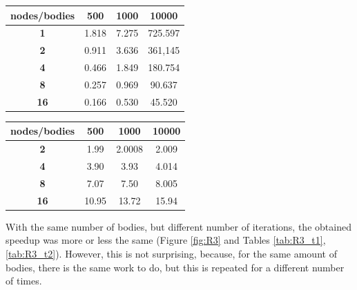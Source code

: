 \documentclass[a4paper]{article}
\begin{document}
\begin{minipage}[b]{.40\textwidth}
  \centering
\begin{tabular}{c|c|c|c}
\textbf{nodes/bodies} & \textbf{500} & \textbf{1000} & \textbf{10000} \\ \hline
\textbf{1}            & 1.818        & 7.275         & 725.597        \\ \hline
\textbf{2}            & 0.911        & 3.636         & 361,145        \\ \hline
\textbf{4}            & 0.466        & 1.849         & 180.754        \\ \hline
\textbf{8}            & 0.257        & 0.969         & 90.637         \\ \hline
\textbf{16}           & 0.166        & 0.530         & 45.520        
\end{tabular}
  \label{tab:R2_t1}
\end{minipage} \qquad
\begin{minipage}[b]{.40\textwidth}
  \centering
\begin{tabular}{c|c|c|c}
\textbf{nodes/bodies} & \textbf{500} & \textbf{1000} & \textbf{10000} \\ \hline
\textbf{2}            & 1.99         & 2.0008        & 2.009          \\ \hline
\textbf{4}            & 3.90         & 3.93          & 4.014          \\ \hline
\textbf{8}            & 7.07         & 7.50          & 8.005          \\ \hline
\textbf{16}           & 10.95        & 13.72         & 15.94         
\end{tabular}
  \label{tab:R2_t2}
\end{minipage}	

\vspace{8mm}

With the same number of bodies, but different number of iterations, the obtained speedup was more or less the same (Figure \ref{fig:R3} and Tables \ref{tab:R3_t1}, \ref{tab:R3_t2}). However, this is not surprising, because, for the same amount of bodies, there is the same work to do, but this is repeated for a different number of times.
\end{document}
